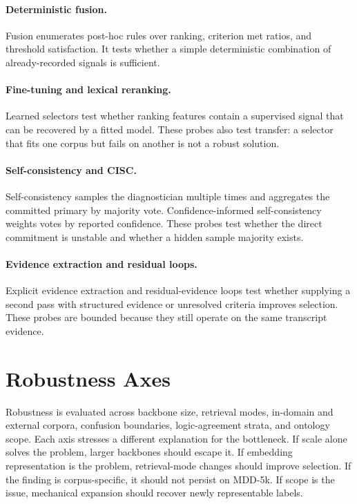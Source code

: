 \paragraph{Deterministic fusion.} Fusion enumerates post-hoc rules over ranking, criterion met ratios, and threshold satisfaction. It tests whether a simple deterministic combination of already-recorded signals is sufficient.

\paragraph{Fine-tuning and lexical reranking.} Learned selectors test whether ranking features contain a supervised signal that can be recovered by a fitted model. These probes also test transfer: a selector that fits one corpus but fails on another is not a robust solution.

\paragraph{Self-consistency and CISC.} Self-consistency samples the diagnostician multiple times and aggregates the committed primary by majority vote. Confidence-informed self-consistency weights votes by reported confidence. These probes test whether the direct commitment is unstable and whether a hidden sample majority exists.

\paragraph{Evidence extraction and residual loops.} Explicit evidence extraction and residual-evidence loops test whether supplying a second pass with structured evidence or unresolved criteria improves selection. These probes are bounded because they still operate on the same transcript evidence.

\section{Robustness Axes}

Robustness is evaluated across backbone size, retrieval modes, in-domain and external corpora, confusion boundaries, logic-agreement strata, and ontology scope. Each axis stresses a different explanation for the bottleneck. If scale alone solves the problem, larger backbones should escape it. If embedding representation is the problem, retrieval-mode changes should improve selection. If the finding is corpus-specific, it should not persist on MDD-5k. If scope is the issue, mechanical expansion should recover newly representable labels.

